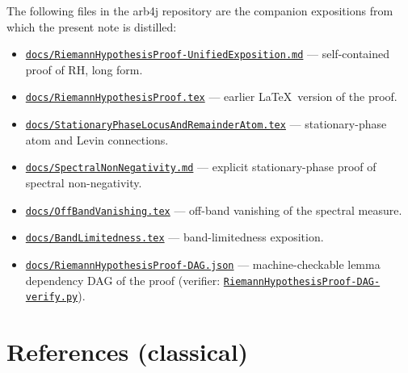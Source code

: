\documentclass[11pt,a4paper]{article}
\theoremstyle{definition}
\begin{document}
The following files in the arb4j repository are the companion expositions from
which the present note is distilled:
\begin{itemize}[leftmargin=*]
  \item \href{https://github.com/crowlogic/arb4j/blob/master/docs/RiemannHypothesisProof-UnifiedExposition.md}%
  {\texttt{docs/RiemannHypothesisProof-UnifiedExposition.md}} ---
  self-contained proof of RH, long form.
  \item \href{https://github.com/crowlogic/arb4j/blob/master/docs/RiemannHypothesisProof.tex}%
  {\texttt{docs/RiemannHypothesisProof.tex}} --- earlier \LaTeX\ version of the
  proof.
  \item \href{https://github.com/crowlogic/arb4j/blob/master/docs/StationaryPhaseLocusAndRemainderAtom.tex}%
  {\texttt{docs/StationaryPhaseLocusAndRemainderAtom.tex}} --- stationary-phase
  atom and Levin connections.
  \item \href{https://github.com/crowlogic/arb4j/blob/master/docs/SpectralNonNegativity.md}%
  {\texttt{docs/SpectralNonNegativity.md}} --- explicit stationary-phase proof of
  spectral non-negativity.
  \item \href{https://github.com/crowlogic/arb4j/blob/master/docs/OffBandVanishing.tex}%
  {\texttt{docs/OffBandVanishing.tex}} --- off-band vanishing of the spectral
  measure.
  \item \href{https://github.com/crowlogic/arb4j/blob/master/docs/BandLimitedness.tex}%
  {\texttt{docs/BandLimitedness.tex}} --- band-limitedness exposition.
  \item \href{https://github.com/crowlogic/arb4j/blob/master/docs/RiemannHypothesisProof-DAG.json}%
  {\texttt{docs/RiemannHypothesisProof-DAG.json}} --- machine-checkable lemma
  dependency DAG of the proof (verifier:
  \href{https://github.com/crowlogic/arb4j/blob/master/docs/RiemannHypothesisProof-DAG-verify.py}%
  {\texttt{RiemannHypothesisProof-DAG-verify.py}}).
\end{itemize}

\section*{References (classical)}
\end{document}
